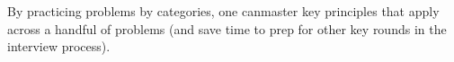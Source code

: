 By practicing problems by categories, one canmaster key principles that apply across a handful of problems (and save time to prep for other key rounds in the interview process).

\subsubsection{}\label{B9iXWCFjL573rjdAF7HZt}

